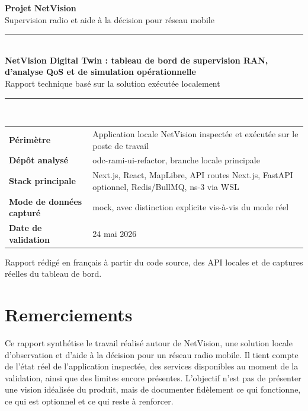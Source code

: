 \documentclass[12pt,a4paper,oneside]{report}
\newcommand{\ProjectTitle}{NetVision Digital Twin : tableau de bord de supervision RAN, d'analyse QoS et de simulation opérationnelle}
\newcommand{\ProjectSubtitle}{Rapport technique basé sur la solution exécutée localement}
\begin{document}
\begin{titlepage}
\thispagestyle{empty}
\begin{center}
\vspace*{0.8cm}
{\Large \textbf{Projet NetVision}}\\[0.3cm]
{\large Supervision radio et aide à la décision pour réseau mobile}\\[1.2cm]

\rule{0.88\textwidth}{0.6pt}\\[0.9cm]
{\Huge \bfseries \ProjectTitle}\\[0.4cm]
{\Large \ProjectSubtitle}\\[0.9cm]
\rule{0.88\textwidth}{0.6pt}\\[1.2cm]

\begin{tabular}{>{\bfseries}p{4.5cm}p{8cm}}
Périmètre & Application locale NetVision inspectée et exécutée sur le poste de travail \\
Dépôt analysé & odc-rami-ui-refactor, branche locale principale \\
Stack principale & Next.js, React, MapLibre, API routes Next.js, FastAPI optionnel, Redis/BullMQ, ns-3 via WSL \\
Mode de données capturé & mock, avec distinction explicite vis-à-vis du mode réel \\
Date de validation & 24 mai 2026 \\
\end{tabular}

\vfill
{\large Rapport rédigé en français à partir du code source, des API locales et de captures réelles du tableau de bord.}
\end{center}
\end{titlepage}


\chapter*{Remerciements}
Ce rapport synthétise le travail réalisé autour de NetVision, une solution locale d'observation et d'aide à la décision pour un réseau radio mobile. Il tient compte de l'état réel de l'application inspectée, des services disponibles au moment de la validation, ainsi que des limites encore présentes. L'objectif n'est pas de présenter une vision idéalisée du produit, mais de documenter fidèlement ce qui fonctionne, ce qui est optionnel et ce qui reste à renforcer.
\end{document}
